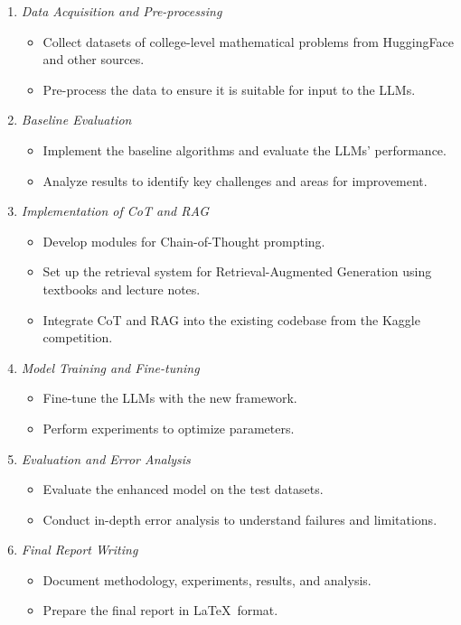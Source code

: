 \documentclass[11pt,a4paper]{article}
\begin{document}
\begin{enumerate}
    \item \textit{Data Acquisition and Pre-processing}
    \begin{itemize}
        \item Collect datasets of college-level mathematical problems from HuggingFace and other sources.
        \item Pre-process the data to ensure it is suitable for input to the LLMs.
    \end{itemize}

    \item \textit{Baseline Evaluation}
    \begin{itemize}
        \item Implement the baseline algorithms and evaluate the LLMs' performance.
        \item Analyze results to identify key challenges and areas for improvement.
    \end{itemize}

    \item \textit{Implementation of CoT and RAG}
    \begin{itemize}
        \item Develop modules for Chain-of-Thought prompting.
        \item Set up the retrieval system for Retrieval-Augmented Generation using textbooks and lecture notes.
        \item Integrate CoT and RAG into the existing codebase from the Kaggle competition.
    \end{itemize}

    \item \textit{Model Training and Fine-tuning}
    \begin{itemize}
        \item Fine-tune the LLMs with the new framework.
        \item Perform experiments to optimize parameters.
    \end{itemize}

    \item \textit{Evaluation and Error Analysis}
    \begin{itemize}
        \item Evaluate the enhanced model on the test datasets.
        \item Conduct in-depth error analysis to understand failures and limitations.
    \end{itemize}

    \item \textit{Final Report Writing}
    \begin{itemize}
        \item Document methodology, experiments, results, and analysis.
        \item Prepare the final report in \LaTeX~format.
    \end{itemize}
\end{enumerate}
\end{document}
